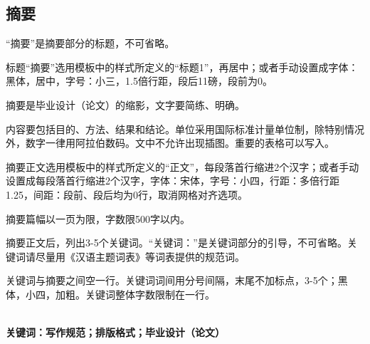 	\begin{spacing}{1.7}
	\section*{ {\heiti 摘\quad\quad 要}}
	\end{spacing}
	\begin{spacing}{1.4}
	{\songti “摘要”是摘要部分的标题，不可省略。\par 
	标题“摘要”选用模板中的样式所定义的“标题1”，再居中；或者手动设置成字体：黑体，居中，字号：小三，1.5倍行距，段后11磅，段前为0。\par 
	摘要是毕业设计（论文）的缩影，文字要简练、明确。\par 
	内容要包括目的、方法、结果和结论。单位采用国际标准计量单位制，除特别情况外，数字一律用阿拉伯数码。文中不允许出现插图。重要的表格可以写入。\par 
	摘要正文选用模板中的样式所定义的“正文”，每段落首行缩进2个汉字；或者手动设置成每段落首行缩进2个汉字，字体：宋体，字号：小四，行距：多倍行距 1.25，间距：段前、段后均为0行，取消网格对齐选项。\par 
	摘要篇幅以一页为限，字数限500字以内。\par 
	摘要正文后，列出3-5个关键词。“关键词：”是关键词部分的引导，不可省略。关键词请尽量用《汉语主题词表》等词表提供的规范词。\par 
	关键词与摘要之间空一行。关键词词间用分号间隔，末尾不加标点，3-5个；黑体，小四，加粗。关键词整体字数限制在一行。\par }
	\quad \\
	{\textbf{ \heiti 关键词：写作规范；排版格式；毕业设计（论文）}}
	\end{spacing}
	\newpage
